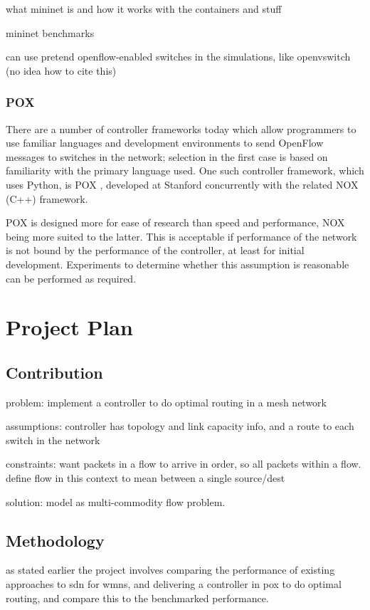 \documentclass[pdftex,12pt,a4paper]{article}
\begin{document}
what mininet is and how it works with the containers and stuff \cite{handigol:mininet}

mininet benchmarks \cite{handigol:benchmarks}

can use pretend openflow-enabled switches in the simulations, like openvswitch (no idea how to cite this)

\subsubsection{POX}
There are a number of controller frameworks today which allow programmers to use familiar languages and development environments to send OpenFlow messages to switches in the network; selection in the first case is based on familiarity with the primary language used. One such controller framework, which uses Python, is POX \cite{onl:pox}, developed at Stanford concurrently with the related NOX (C++) framework.

POX is designed more for ease of research than speed and performance, NOX being more suited to the latter. This is acceptable if performance of the network is not bound by the performance of the controller, at least for initial development. Experiments to determine whether this assumption is reasonable can be performed as required.

\newpage
\section{Project Plan}
\subsection{Contribution}
problem: implement a controller to do optimal routing in a mesh network

assumptions: controller has topology and link capacity info, and a route to each switch in the network

constraints: want packets in a flow to arrive in order, so all packets within a flow. define flow in this context to mean between a single source/dest

solution: model as multi-commodity flow problem.

\subsection{Methodology}

as stated earlier the project involves comparing the performance of existing approaches to sdn for wmns, and delivering a controller in pox to do optimal routing, and compare this to the benchmarked performance.
\end{document}
